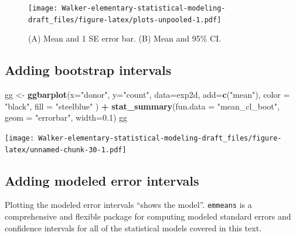 \documentclass[]{book}
\newenvironment{Shaded}{\begin{snugshade}}{\end{snugshade}}
\newcommand{\KeywordTok}[1]{\textcolor[rgb]{0.13,0.29,0.53}{\textbf{#1}}}
\newcommand{\DataTypeTok}[1]{\textcolor[rgb]{0.13,0.29,0.53}{#1}}
\newcommand{\FloatTok}[1]{\textcolor[rgb]{0.00,0.00,0.81}{#1}}
\newcommand{\StringTok}[1]{\textcolor[rgb]{0.31,0.60,0.02}{#1}}
\newcommand{\OperatorTok}[1]{\textcolor[rgb]{0.81,0.36,0.00}{\textbf{#1}}}
\newcommand{\NormalTok}[1]{#1}
\begin{document}
\begin{figure}
\centering
\texttt{[image: Walker-elementary-statistical-modeling-draft\_files/figure-latex/plots-unpooled-1.pdf]}
\caption{\label{fig:plots-unpooled}(A) Mean and 1 SE error bar. (B) Mean and
95\% CI.}
\end{figure}

\subsection{Adding bootstrap
intervals}\label{adding-bootstrap-intervals}

\begin{Shaded}
\begin{Highlighting}[]
\NormalTok{gg <-}\StringTok{ }\KeywordTok{ggbarplot}\NormalTok{(}\DataTypeTok{x=}\StringTok{"donor"}\NormalTok{, }
                \DataTypeTok{y=}\StringTok{"count"}\NormalTok{, }
                \DataTypeTok{data=}\NormalTok{exp2d,}
                \DataTypeTok{add=}\KeywordTok{c}\NormalTok{(}\StringTok{"mean"}\NormalTok{),}
                \DataTypeTok{color =} \StringTok{"black"}\NormalTok{,}
                \DataTypeTok{fill =} \StringTok{"steelblue"}
\NormalTok{) }\OperatorTok{+}\StringTok{ }
\StringTok{  }\KeywordTok{stat_summary}\NormalTok{(}\DataTypeTok{fun.data =} \StringTok{"mean_cl_boot"}\NormalTok{, }\DataTypeTok{geom =} \StringTok{"errorbar"}\NormalTok{, }\DataTypeTok{width=}\FloatTok{0.1}\NormalTok{)}
\NormalTok{gg}
\end{Highlighting}
\end{Shaded}

\texttt{[image: Walker-elementary-statistical-modeling-draft\_files/figure-latex/unnamed-chunk-30-1.pdf]}

\subsection{Adding modeled error
intervals}\label{adding-modeled-error-intervals}

Plotting the modeled error intervals ``shows the model''.
\texttt{emmeans} is a comprehensive and flexible package for computing
modeled standard errors and confidence intervals for all of the
statistical models covered in this text.
\end{document}
